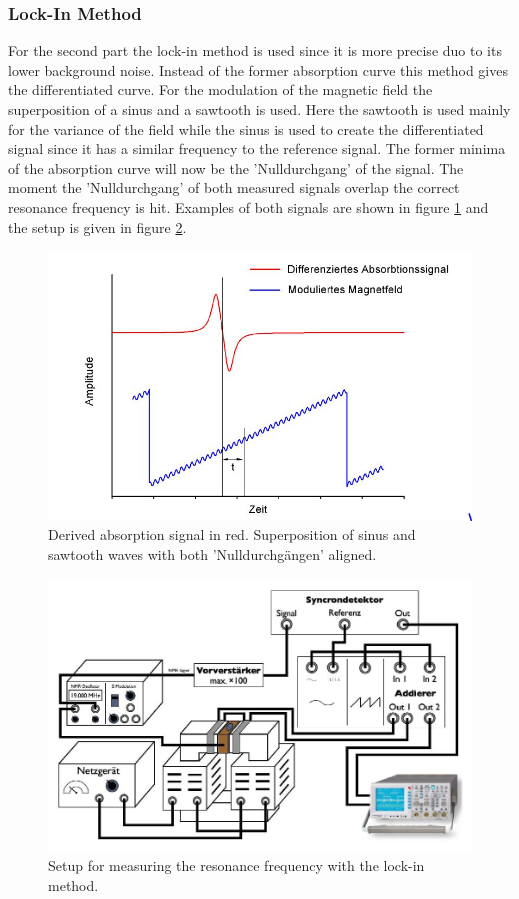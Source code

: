 \subsubsection{Lock-In Method}
For the second part the lock-in method is used since it is more precise duo to its lower background noise. Instead of the former absorption curve this method gives the differentiated curve. For the modulation of the magnetic field the superposition of a sinus and a sawtooth is used. Here the sawtooth is used mainly for the variance of the field while the sinus is used to create the differentiated signal since it has a similar frequency to the reference signal. The former minima of the absorption curve will now be the 'Nulldurchgang' of the signal. The moment the 'Nulldurchgang' of both measured signals overlap the correct resonance frequency is hit. Examples of both signals are shown in figure \ref{SägezahnBsp} and the setup is given in figure \ref{Exp_part2}.
\begin{figure}[ht]
	\includegraphics[scale=0.8]{Bild/BspLockIn}
	\centering
	\caption{Derived absorption signal in red. Superposition of sinus and sawtooth waves with both 'Nulldurchgängen' aligned.}
	\label{SägezahnBsp}
\end{figure}
\begin{figure}[ht]
	\includegraphics[scale=0.8]{Bild/Setup2}
	\centering
	\caption[Block Diagram for Setup 2]{Setup for measuring the resonance frequency with the lock-in method.}
	\label{Exp_part2}
\end{figure}

